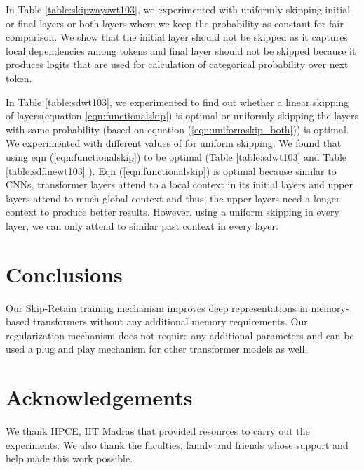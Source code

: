 \documentclass[11pt]{article}
\begin{document}
In Table \ref{table:skipwayswt103}, we experimented with uniformly skipping initial or final layers or both layers where we keep the probability  as constant for fair comparison. We show that the initial layer should not be skipped as it captures local dependencies among tokens and final layer should not be skipped because it produces logits that are used for calculation of categorical probability over next token.


In Table \ref{table:sdwt103}, we experimented to find out whether a linear skipping of layers(equation \ref{eqn:functionalskip}) is optimal or uniformly skipping the layers with same probability (based on equation (\ref{eqn:uniformskip_both})) is optimal. We experimented with different values of  for uniform skipping.
We found that using eqn (\ref{eqn:functionalskip}) to be optimal (Table \ref{table:sdwt103} and Table \ref{table:sdfinewt103} ). Eqn (\ref{eqn:functionalskip}) is optimal because similar to CNNs, transformer layers attend to a local context in its initial layers and upper layers attend to much global context and thus, the upper layers need a longer context to produce better results. However, using a uniform skipping in every layer, we can only attend to similar past context in every layer.



\section{Conclusions}


Our Skip-Retain training mechanism improves deep representations in memory-based transformers without any additional memory requirements. Our regularization mechanism does not require any additional parameters and can be used a plug and play mechanism for other transformer models as well. 


















\section*{Acknowledgements}

We thank HPCE, IIT Madras that provided resources to carry out the experiments. We also thank the faculties, family and friends whose support and help made this work possible.
\end{document}

